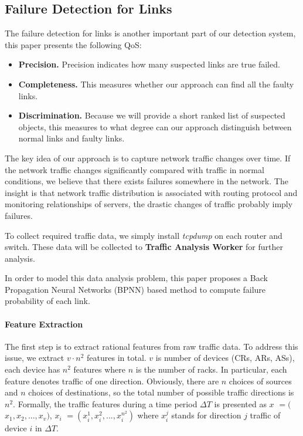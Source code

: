 \documentclass{sig-alternate-05-2015}
\begin{document}
\subsection{Failure Detection for Links}
The failure detection for links is another important part of our detection system, this paper presents the following QoS:
\begin{itemize}
  \item \textbf{Precision.} Precision indicates how many suspected links are true failed.
  \item \textbf{Completeness.} This measures whether our approach can find all the faulty links.
  \item \textbf{Discrimination.} Because we will provide a short ranked list of suspected objects, this measures to what degree can our approach distinguish between normal links and faulty links.
\end{itemize}

The key idea of our approach is to capture network traffic changes over time. If the network traffic changes significantly compared with traffic in normal conditions, we believe that there exists failures somewhere in the network. The insight is that network traffic distribution is associated with routing protocol and monitoring relationships of servers, the drastic changes of traffic probably imply failures.

To collect required traffic data, we simply install \textit{tcpdump} on each router and switch. These data will be collected to \textbf{Traffic Analysis Worker} for further analysis.

In order to model this data analysis problem, this paper proposes a Back Propagation Neural Networks (BPNN) based method to compute failure probability of each link.

\paragraph{Feature Extraction}
The first step is to extract rational features from raw traffic data. To address this issue, we extract $v \cdot n^2$ features in total. $v$ is number of devices (CRs, ARs, ASs), each device has $n^2$ features where $n$ is the number of racks. In particular, each feature denotes traffic of one direction. Obviously, there are $n$ choices of sources and $n$ choices of destinations, so the total number of possible traffic directions is $n^2$. 
Formally, the traffic features during a time period $\Delta T$ is presented as \boldmath $x$ 
\unboldmath $=($\boldmath $x_1, x_2, ..., x_v$\unboldmath $)$, \boldmath $x_i$
\unboldmath $=(x_i^1, x_i^2, ..., x_i^{n^2})$
where $x_i^j$ stands for direction $j$ traffic of device $i$ in $\Delta T$.
\end{document}
